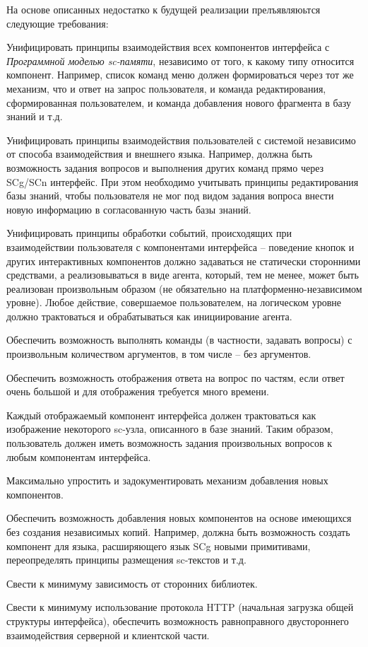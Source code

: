 \begin{scnitemize}
\begin{scnitemize}
На основе описанных недостатко к будущей реализации прелъявляюьтся следующие требования:
\begin{scnitemize}
    \item Унифицировать принципы взаимодействия всех компонентов интерфейса с \textit{Программной моделью sc-памяти},
    независимо от того, к какому типу относится компонент. Например, список команд меню должен формироваться через тот
    же механизм, что и ответ на запрос пользователя, и команда редактирования, сформированная пользователем, и команда
    добавления нового фрагмента в базу знаний и т.д.
    \item Унифицировать принципы взаимодействия пользователей с системой независимо от способа взаимодействия и
    внешнего языка. Например, должна быть возможность задания вопросов и выполнения других команд прямо через SCg/SCn
    интерфейс. При этом необходимо учитывать принципы редактирования базы знаний, чтобы пользователя не мог под
    видом задания вопроса внести новую информацию в согласованную часть базы знаний.
    \item Унифицировать принципы обработки событий, происходящих при взаимодействии пользователя с компонентами
    интерфейса -- поведение кнопок и других интерактивных компонентов должно задаваться не статически сторонними
    средствами, а реализовываться в виде агента, который, тем не менее, может быть реализован произвольным образом
    (не обязательно на платформенно-независимом уровне). Любое действие, совершаемое пользователем, на логическом
    уровне должно трактоваться и обрабатываться как инициирование агента.
    \item Обеспечить возможность выполнять команды (в частности, задавать вопросы) с произвольным количеством
    аргументов, в том числе -- без аргументов.
    \item Обеспечить возможность отображения ответа на вопрос по частям, если ответ очень большой и для отображения
    требуется много времени.
    \item Каждый отображаемый компонент интерфейса должен трактоваться как изображение некоторого sc-узла, описанного в
    базе знаний. Таким образом, пользователь должен иметь возможность задания произвольных вопросов к любым компонентам
    интерфейса.
    \item Максимально упростить и задокументировать механизм добавления новых компонентов.
    \item Обеспечить возможность добавления новых компонентов на основе имеющихся без создания независимых копий.
    Например, должна быть возможность создать компонент для языка, расширяющего язык SCg новыми примитивами,
    переопределять принципы размещения sc-текстов и т.д.
    \item Свести к минимуму зависимость от сторонних библиотек.
    \item Свести к минимуму использование протокола HTTP (начальная загрузка общей структуры интерфейса), обеспечить
    возможность равноправного двустороннего взаимодействия серверной и клиентской части.
\end{scnitemize}


\end{scnitemize}
\end{scnitemize}

